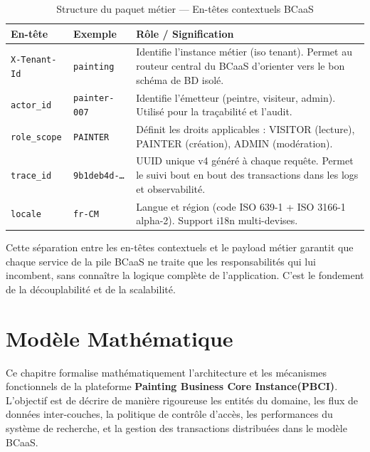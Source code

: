 \documentclass[12pt,a4paper]{report}
\begin{document}
\begin{table}[H]
\centering
\caption{Structure du paquet métier --- En-têtes contextuels BCaaS}
\label{tab:metadata_headers}
\small
\begin{tabular}{|p{}|p{}|p{}|}
\hline
\textbf{En-tête} & \textbf{Exemple} & \textbf{Rôle / Signification} \\
\hline
\texttt{X-Tenant-Id} & \texttt{painting} & Identifie l'instance métier (iso tenant). Permet au routeur central du BCaaS d'orienter vers le bon schéma de BD isolé. \\
\hline
\texttt{actor\_id} & \texttt{painter-007} & Identifie l'émetteur (peintre, visiteur, admin). Utilisé pour la traçabilité et l'audit. \\
\hline
\texttt{role\_scope} & \texttt{PAINTER} & Définit les droits applicables : VISITOR (lecture), PAINTER (création), ADMIN (modération). \\
\hline
\texttt{trace\_id} & \texttt{9b1deb4d-\ldots} & UUID unique v4 généré à chaque requête. Permet le suivi bout en bout des transactions dans les logs et observabilité. \\
\hline
\texttt{locale} & \texttt{fr-CM} & Langue et région (code ISO 639-1 + ISO 3166-1 alpha-2). Support i18n multi-devises. \\
\hline
\end{tabular}
\end{table}

Cette séparation entre les en-têtes contextuels et le payload métier garantit que chaque service de la pile BCaaS ne traite que les responsabilités qui lui incombent, sans connaître la logique complète de l'application. C'est le fondement de la découplabilité et de la scalabilité.

\newpage

\section{Modèle Mathématique}

Ce chapitre formalise mathématiquement l'architecture et les mécanismes fonctionnels
de la plateforme \textbf{Painting Business Core Instance(PBCI)}. L'objectif est de décrire de manière
rigoureuse les entités du domaine, les flux de données inter-couches, la politique de
contrôle d'accès, les performances du système de recherche, et la gestion des transactions
distribuées dans le modèle BCaaS.
\end{document}
